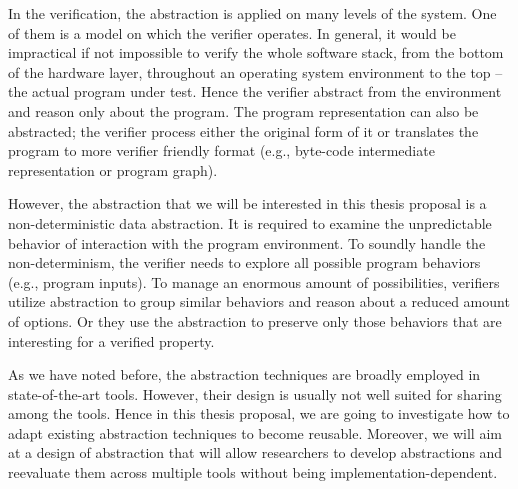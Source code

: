 In the verification, the abstraction is applied on many levels of the system.
One of them is a model on which the verifier operates. In general, it would be
impractical if not impossible to verify the whole software stack, from the
bottom of the hardware layer, throughout an operating system environment to the
top -- the actual program under test. Hence the verifier abstract from the
environment and reason only about the program. The program representation can
also be abstracted; the verifier process either the original form of it or
translates the program to more verifier friendly format (e.g., byte-code
intermediate representation or program graph).

However, the abstraction that we will be interested in this thesis proposal is
a non-deterministic data abstraction. It is required to examine the
unpredictable behavior of interaction with the program environment. To soundly
handle the non-determinism, the verifier needs to explore all possible program
behaviors (e.g., program inputs). To manage an enormous amount of
possibilities, verifiers utilize abstraction to group similar behaviors and
reason about a reduced amount of options. Or they use the abstraction to
preserve only those behaviors that are interesting for a verified property.

As we have noted before, the abstraction techniques are broadly employed in
state-of-the-art tools. However, their design is usually not well suited for
sharing among the tools. Hence in this thesis proposal, we are going to
investigate how to adapt existing abstraction techniques to become reusable.
Moreover, we will aim at a design of abstraction that will allow researchers to
develop abstractions and reevaluate them across multiple tools without being
implementation-dependent.


